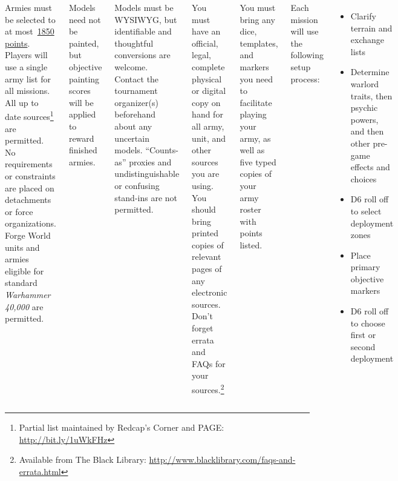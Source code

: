 \documentclass{40k}
\begin{document}

\begin{columns}


Armies must be selected to at most~\underline{1850 points}.  Players
will use a single army list for all missions.  All up to date
sources\footnote{Partial list maintained by Redcap's Corner and PAGE:
  \url{http://bit.ly/1uWkFHz}} are permitted.  No requirements or
constraints are placed on detachments or force organizations.  Forge
World units and armies eligible for standard \emph{Warhammer 40,000}
are permitted.

Models need not be painted, but objective painting scores will be
applied to reward finished armies.

Models must be WYSIWYG, but identifiable and thoughtful conversions
are welcome.  Contact the tournament organizer(s) beforehand about any
uncertain models.  ``Counts-as'' proxies and undistinguishable or
confusing stand-ins are not permitted.


You must have an official, legal, complete physical or digital copy on
hand for all army, unit, and other sources you are using.  You should
bring printed copies of relevant pages of any electronic sources.
Don't forget errata and FAQs for your sources.\footnote{Available from
  The Black Library:
  \url{http://www.blacklibrary.com/faqs-and-errata.html}}

You must bring any dice, templates, and markers you need to facilitate
playing your army, as well as five typed copies of your army roster
with points listed.


Each mission will use the following setup process:

\begin{itemize}\shortlist
\item Clarify terrain and exchange lists

\item Determine warlord traits, then psychic powers, and then other
  pre-game effects and choices

\item D6 roll off to select deployment zones

\item Place primary objective markers

\item D6 roll off to choose first or second deployment


\end{itemize}
\end{columns}
\end{document}
